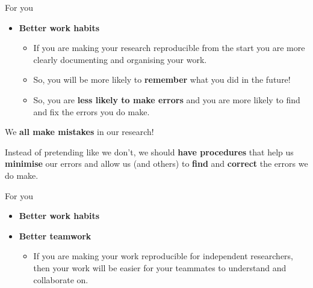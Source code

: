 \documentclass[10pt]{beamer}
\begin{document}
\begin{frame}{For you}

    \begin{itemize}
        \item \textbf{Better work habits}

            \begin{itemize}
                \item If you are making your research reproducible from the start you are more clearly documenting and organising your work.

                \item So, you will be more likely to \textbf{remember} what you did in the future!

                \item So, you are \textbf{less likely to make errors} and you are more likely to find and fix the errors you do make.
            \end{itemize}

    \end{itemize}

\end{frame}

\begin{frame}

    \begin{center}
        {\LARGE{We \textbf{all make mistakes} in our research!}}

        \vspace{1cm}

        Instead of pretending like we don't, we should \textbf{have procedures} that help us \textbf{minimise} our errors and allow us (and others) to \textbf{find} and \textbf{correct} the errors we do make.
    \end{center}

\end{frame}

\begin{frame}{For you}

    \begin{itemize}
        \item \textbf{Better work habits}

        \vspace{0.5cm}

        \item \textbf{Better teamwork}

        \begin{itemize}
            \item If you are making your work reproducible for independent researchers, then your work will be easier for your teammates to understand and collaborate on.
        \end{itemize}

    \end{itemize}

\end{frame}
\end{document}
